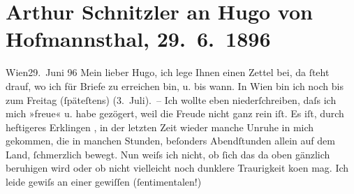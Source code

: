 

         
         \renewcommand{\erwaehntePersonen}{Personen: Marie Glümer, Hugo von Hofmannsthal, Hugo August von Hofmannsthal, Anna von Hofmannsthal, Olga Waissnix}
         \renewcommand{\erwaehnteOrte}{Orte: Wien}
         \renewcommand{\erwaehnteWerke}{Werke: Freiwild. Schauspiel in 3 Akten, Geschichte der beiden Liebespaare}
               \section[Arthur Schnitzler an Hugo von Hofmannsthal, 29. 6. 1896]{ Arthur Schnitzler an Hugo von Hofmannsthal, 29. 6. 1896}\nopagebreak{}\rehead{ }\begin{ledgroupsized}[t]{13cm}\normalsize\beginnumbering \toendnotes[C]{\smallbreak\pagebreak[2]} 
\toendnotes[C]{\smallbreak}\pstart
           \raggedleft{}{\pb}Wien29. Juni 96\pend
           \pstart
           Mein lieber Hugo, ich lege Ihnen einen Zettel bei, da ſteht drauf,
               wo ich für Briefe zu erreichen bin, u. bis wann. In Wien bin ich noch bis zum Freitag (ſpäteſtens)
                  (3. Juli). –\pend
           \pstart
           Ich wollte eben niederſchreiben, daſs ich mich »freue« u. habe gezögert, weil die
               Freude nicht ganz rein iſt. Es iſt, durch heftigeres Erklin{\pb}gen \label{K_L00557-1v}\label{K_L00557-1h}, in der letzten Zeit
               wieder manche Unruhe in mich gekommen, die in manchen Stunden, beſonders Abendſtunden
               allein auf dem Land, ſchmerzlich bewegt. Nun weiſs ich nicht, ob ſich das da oben
               gänzlich beruhigen wird oder ob nicht vielleicht noch dunklere Traurigkeit ko{\geminationm}en mag. Ich leide gewiſs an {\pb}einer gewiſſen \introOben{}(\introOben{}ſentimentalen\introOben{}!)\introOben{}

\end{ledgroupsized}
